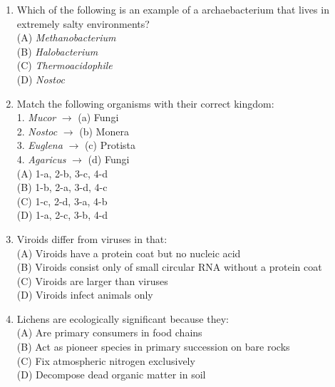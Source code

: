 \documentclass{article}
\begin{document}
\begin{enumerate}[label=Q\arabic*.]
\item Which of the following is an example of a archaebacterium that lives in extremely salty environments?
\\(A) \textit{Methanobacterium}
\\(B) \textit{Halobacterium}
\\(C) \textit{Thermoacidophile}
\\(D) \textit{Nostoc}

\item Match the following organisms with their correct kingdom:\\
1. \textit{Mucor} $\rightarrow$ (a) Fungi\\
2. \textit{Nostoc} $\rightarrow$ (b) Monera\\
3. \textit{Euglena} $\rightarrow$ (c) Protista\\
4. \textit{Agaricus} $\rightarrow$ (d) Fungi
\\(A) 1-a, 2-b, 3-c, 4-d
\\(B) 1-b, 2-a, 3-d, 4-c
\\(C) 1-c, 2-d, 3-a, 4-b
\\(D) 1-a, 2-c, 3-b, 4-d

\item Viroids differ from viruses in that:
\\(A) Viroids have a protein coat but no nucleic acid
\\(B) Viroids consist only of small circular RNA without a protein coat
\\(C) Viroids are larger than viruses
\\(D) Viroids infect animals only

\item Lichens are ecologically significant because they:
\\(A) Are primary consumers in food chains
\\(B) Act as pioneer species in primary succession on bare rocks
\\(C) Fix atmospheric nitrogen exclusively
\\(D) Decompose dead organic matter in soil

\end{enumerate}
\end{document}
